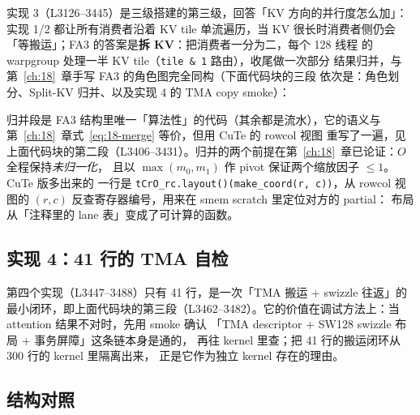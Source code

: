 实现 3（L3126--3445）是三级搭建的第三级，回答「KV 方向的并行度怎么加」：
实现 1/2 都让所有消费者沿着 KV tile 单流遍历，当 KV 很长时消费者侧仍会
「等搬运」；FA3 的答案是\textbf{拆 KV}：把消费者一分为二，每个 128 线程
的 warpgroup 处理一半 KV tile（\texttt{tile \& 1} 路由），收尾做一次部分
结果归并，与第~\ref{ch:18}~章手写 FA3 的角色图完全同构（下面代码块的三段
依次是：角色划分、Split-KV 归并、以及实现 4 的 TMA copy smoke）：



归并段是 FA3 结构里唯一「算法性」的代码（其余都是流水），它的语义与
第~\ref{ch:18}~章式~\ref{eq:18-merge} 等价，但用 CuTe 的 rowcol 视图
重写了一遍，见上面代码块的第二段（L3406--3431）。归并的两个前提在第~\ref{ch:18}~章已论证：$O$ 全程保持\emph{未归一化}，
且以 $\max(m_0,m_1)$ 作 pivot 保证两个缩放因子 $\le 1$。CuTe 版多出来的
一行是 \texttt{tCrO\_\allowbreak{}rc.layout\allowbreak{}()\allowbreak{}(make\_\allowbreak{}coord\allowbreak{}(r,\allowbreak{} c))}，从 rowcol 视图的
$(r,c)$ 反查寄存器编号，用来在 smem scratch 里定位对方的 partial：
布局从「注释里的 lane 表」变成了可计算的函数。

\subsection{实现 4：41 行的 TMA 自检}

第四个实现（L3447--3488）只有 41 行，是一次「TMA 搬运 + swizzle 往返」的
最小闭环，即上面代码块的第三段（L3462--3482）。它的价值在调试方法上：当 attention 结果不对时，先用 smoke 确认
「TMA descriptor + SW128 swizzle 布局 + 事务屏障」这条链本身是通的，
再往 kernel 里查；把 41 行的搬运闭环从 300 行的 kernel 里隔离出来，
正是它作为独立 kernel 存在的理由。

\subsection{结构对照}

